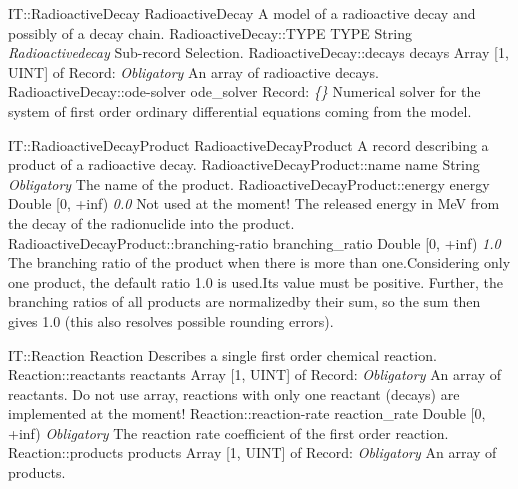 \begin{RecordType}
	{IT::RadioactiveDecay}
	{RadioactiveDecay}
	{} %
	{} %
	{{{A model of a radioactive decay and possibly of a decay chain.}}}
		\RecKey
			{RadioactiveDecay::TYPE}
			{TYPE}
			{{String}}
			{ \it{Radioactivedecay} }
			{{{Sub-record Selection.}}}
		\RecKey
			{RadioactiveDecay::decays}
			{decays}
			{{Array [1, UINT] of }{Record}{: }}
			{ \it{Obligatory} }
			{{{An array of radioactive decays.}}}
		\RecKey
			{RadioactiveDecay::ode-solver}
			{ode{\_}solver}
			{{Record}{: }}
			{ \it{{\{}{\}}} }
			{{{Numerical solver for the system of first order ordinary differential equations coming from the model.}}}
\end{RecordType}
\begin{RecordType}
	{IT::RadioactiveDecayProduct}
	{RadioactiveDecayProduct}
	{} %
	{} %
	{{{A record describing a product of a radioactive decay.}}}
		\RecKey
			{RadioactiveDecayProduct::name}
			{name}
			{{String}}
			{ \it{Obligatory} }
			{{{The name of the product.}}}
		\RecKey
			{RadioactiveDecayProduct::energy}
			{energy}
			{{Double [0, +inf)}}
			{ \it{0.0} }
			{{{Not used at the moment! The released energy in MeV from the decay of the radionuclide into the product.}}}
		\RecKey
			{RadioactiveDecayProduct::branching-ratio}
			{branching{\_}ratio}
			{{Double [0, +inf)}}
			{ \it{1.0} }
			{{{The branching ratio of the product when there is more than one.Considering only one product, the default ratio 1.0 is used.Its value must be positive. Further, the branching ratios of all products are normalizedby their sum, so the sum then gives 1.0 (this also resolves possible rounding errors).}}}
\end{RecordType}
\begin{RecordType}
	{IT::Reaction}
	{Reaction}
	{} %
	{} %
	{{{Describes a single first order chemical reaction.}}}
		\RecKey
			{Reaction::reactants}
			{reactants}
			{{Array [1, UINT] of }{Record}{: }}
			{ \it{Obligatory} }
			{{{An array of reactants. Do not use array, reactions with only one reactant (decays) are implemented at the moment!}}}
		\RecKey
			{Reaction::reaction-rate}
			{reaction{\_}rate}
			{{Double [0, +inf)}}
			{ \it{Obligatory} }
			{{{The reaction rate coefficient of the first order reaction.}}}
		\RecKey
			{Reaction::products}
			{products}
			{{Array [1, UINT] of }{Record}{: }}
			{ \it{Obligatory} }
			{{{An array of products.}}}
\end{RecordType}
